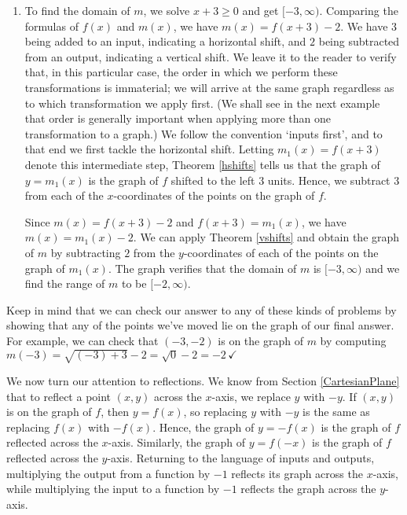 {\begin{enumerate}


\item  To find the domain of $m$, we solve $x+3 \geq 0$ and get $[-3, \infty)$.  Comparing the formulas of $f(x)$ and $m(x)$, we have $m(x) = f(x+3) - 2$.  We have $3$ being added to an input, indicating a horizontal shift,  and $2$ being subtracted from an output, indicating a vertical shift. We leave it to the reader to verify that, in this particular case, the order in which we perform these transformations is immaterial;  we will arrive at the same graph regardless as to which transformation we apply first. (We shall see in the next example that order is  generally important when applying more than one transformation to a graph.) We follow the convention `inputs first', and to that end we first tackle the horizontal shift.  Letting $m_{1}(x) = f(x+3)$ denote this intermediate step,  Theorem \ref{hshifts} tells us that the graph of $y=m_{1}(x)$ is the graph of $f$ shifted to the left $3$ units. Hence, we subtract $3$ from each of the $x$-coordinates of the points on the graph of $f$.  


Since $m(x) = f(x+3)-2$ and $f(x+3) = m_{1}(x)$, we have $m(x) = m_{1}(x) - 2$.  We can apply  Theorem \ref{vshifts} and obtain the graph of $m$ by subtracting $2$ from the $y$-coordinates of each of the points on the graph of $m_{1}(x)$.  The graph verifies that the domain of $m$ is $[-3, \infty)$ and we find the range of $m$ to be $[-2, \infty)$.    


\end{enumerate}

Keep in mind that we can check our answer to any of these kinds of problems by showing that any of the points we've moved lie on the graph of our final answer.  For example, we can check that $(-3,-2)$ is on the graph of $m$ by computing  $m(-3) = \sqrt{(-3)+3} - 2 = \sqrt{0}-2 = -2\, \checkmark$
}

\pagebreak

We now turn our attention to reflections. We know from Section \ref{CartesianPlane} that to reflect a point $(x,y)$ across the $x$-axis, we replace $y$ with $-y$.  If $(x,y)$ is on the graph of $f$, then $y=f(x)$, so replacing $y$ with $-y$ is the same as replacing $f(x)$ with $-f(x)$.  Hence, the graph of $y=-f(x)$ is the graph of $f$ reflected across the $x$-axis.  Similarly, the graph of $y=f(-x)$ is the graph of $f$ reflected across the $y$-axis.   Returning to the language of inputs and outputs, multiplying the output from a function by $-1$ reflects its graph across the $x$-axis, while multiplying the input to a function by $-1$ reflects the graph across the $y$-axis. 

